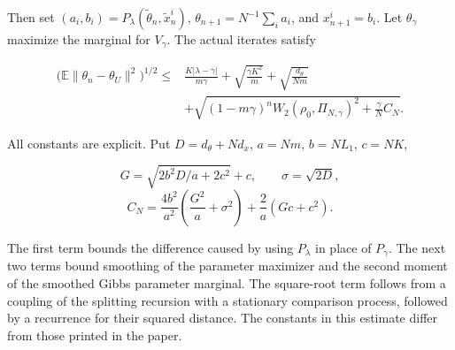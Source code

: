\documentclass[11pt,a4paper]{report}
\begin{document}
Then set \((a_i,b_i)=P_\lambda(\widetilde\theta_n,\widetilde x_n^i)\), \(\theta_{n+1}=N^{-1}\sum_i a_i\), and \(x_{n+1}^i=b_i\). Let \(\theta_\gamma\) maximize the marginal for \(V_\gamma\). The actual iterates satisfy


\[\begin{aligned}
\bigl(\mathbb E\|\theta_n-\theta_U\|^2\bigr)^{1/2}
\le{}&\frac{K|\lambda-\gamma|}{m\gamma}+\sqrt{\frac{\gamma K^2}{m}}+\sqrt{\frac{d_\theta}{Nm}}\\
&+\sqrt{(1-m\gamma)^n W_2(\rho_0,\Pi_{N,\gamma})^2+\frac\gamma N C_N}.
\end{aligned}\]


All constants are explicit. Put \(D=d_\theta+Nd_x\), \(a=Nm\), \(b=NL_1\), \(c=NK\),


\[G=\sqrt{2b^2D/a+2c^2}+c,\qquad\sigma=\sqrt{2D},\]
\[C_N=\frac{4b^2}{a^2}\left(\frac{G^2}{a}+\sigma^2\right)+\frac2a(Gc+c^2).\]


The first term bounds the difference caused by using \(P_\lambda\) in place of \(P_\gamma\). The next two terms bound smoothing of the parameter maximizer and the second moment of the smoothed Gibbs parameter marginal. The square-root term follows from a coupling of the splitting recursion with a stationary comparison process, followed by a recurrence for their squared distance. The constants in this estimate differ from those printed in the paper.
\end{document}
